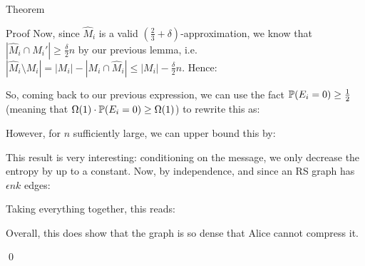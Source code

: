 \documentclass[a4paper]{article}
\begin{document}
\begin{parag}{Theorem}
\begin{subparag}{Proof}
        Now, since $\hat{M}_i$ is a valid $\left(\frac{2}{3} + \delta\right)$-approximation, we know that $\left|\hat{M}_i \cap M_i'\right| \geq \frac{\delta}{2} n$ by our previous lemma, i.e. $\left|\hat{M}_i \setminus M_i\right| = \left|M_i\right| - \left|M_i \cap \hat{M}_i\right| \leq \left|M_i\right| - \frac{\delta}{2}n$. Hence:

        So, coming back to our previous expression, we can use the fact $\prob\left(E_i = 0\right) \geq \frac{1}{2}$ (meaning that $\Omega\left(1\right)\cdot \prob\left(E_i = 0\right) \geq \Omega\left(1\right)$) to rewrite this as:

        However, for $n$ sufficiently large, we can upper bound this by:

        This result is very interesting: conditioning on the message, we only decrease the entropy by up to a constant. Now, by independence, and since an RS graph has $\epsilon n k$ edges: 
        

        Taking everything together, this reads:

        Overall, this does show that the graph is so dense that Alice cannot compress it.
        
        \qed
    \end{subparag}
\end{parag}
\end{document}
